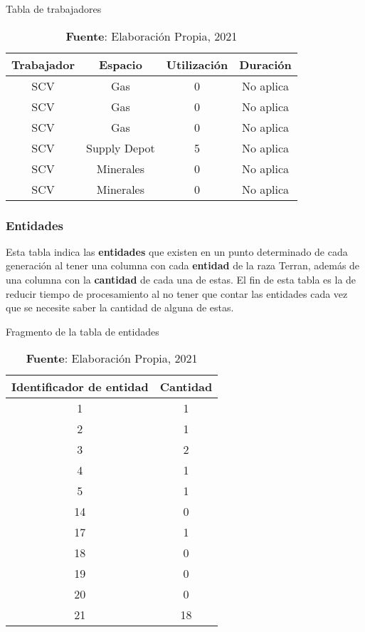 \begin{table}[H]
\centering
\def\arraystretch{1.8}
\captionsetup{justification=centering}
\caption{Tabla de trabajadores}
\label{tab:6}
\begin{tabular}{|c|c|c|c|}
\hline
\textbf{Trabajador} & \textbf{Espacio} & \textbf{Utilización} & \textbf{Duración} \\
\hline
SCV & Gas & 0 & No aplica \\ \hline
SCV & Gas & 0 & No aplica \\ \hline
SCV & Gas & 0 & No aplica \\ \hline
SCV & Supply Depot & 5 & No aplica \\ \hline
SCV & Minerales & 0 & No aplica \\ \hline
SCV & Minerales & 0 & No aplica \\ \hline
\end{tabular}
\caption*{\textbf{Fuente}: Elaboración Propia, 2021}
\end{table}

\subsubsection{Entidades}

Esta tabla indica las \textbf{entidades} que existen en un punto determinado de cada generación al tener una columna con cada \textbf{entidad} de la raza Terran, además de una columna con la \textbf{cantidad} de cada una de estas. El fin de esta tabla es la de reducir tiempo de procesamiento al no tener que contar las entidades cada vez que se necesite saber la cantidad de alguna de estas.

\begin{table}[H]
\centering
\def\arraystretch{1.8}
\captionsetup{justification=centering}
\caption{Fragmento de la tabla de entidades}
\label{tab:7}
\begin{tabular}{|c|c|}
\hline
\textbf{Identificador de entidad} & \textbf{Cantidad} \\
\hline
1 & 1 \\ \hline
2 & 1 \\ \hline
3 & 2 \\ \hline
4 & 1 \\ \hline
5 & 1 \\ \hline
14 & 0 \\ \hline
17 & 1 \\ \hline
18 & 0 \\ \hline
19 & 0 \\ \hline
20 & 0 \\ \hline
21 & 18 \\ \hline
\end{tabular}
\caption*{\textbf{Fuente}: Elaboración Propia, 2021}
\end{table}

